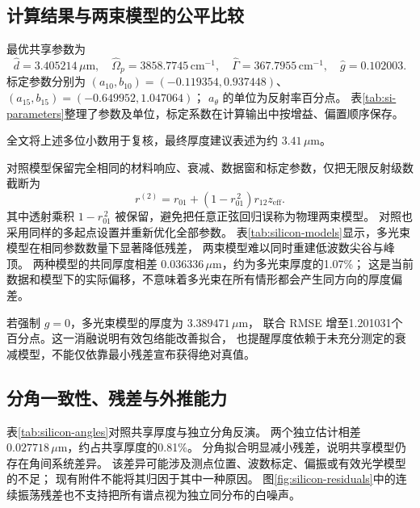 \subsection{计算结果与两束模型的公平比较}
最优共享参数为
\[
 \widehat d=3.405214\,\mu\mathrm m,\quad
 \widehat\Omega_p=3858.7745\,\mathrm{cm}^{-1},\quad
 \widehat\Gamma=367.7955\,\mathrm{cm}^{-1},\quad
 \widehat g=0.102003.
\]
标定参数分别为
$(a_{10},b_{10})=(-0.119354,0.937448)$、
$(a_{15},b_{15})=(-0.649952,1.047064)$；
$a_\theta$ 的单位为反射率百分点。
表\ref{tab:si-parameters}整理了参数及单位，标定系数在计算输出中按增益、偏置顺序保存。

全文将上述多位小数用于复核，最终厚度建议表述为约 $3.41\,\mu\mathrm m$。

对照模型保留完全相同的材料响应、衰减、数据窗和标定参数，仅把无限反射级数截断为
\[
 r^{(2)}=r_{01}+(1-r_{01}^{\,2})r_{12}z_{\mathrm{eff}}.
\]
其中透射乘积 $1-r_{01}^{\,2}$ 被保留，避免把任意正弦回归误称为物理两束模型。
对照也采用同样的多起点设置并重新优化全部参数。
表\ref{tab:silicon-models}显示，多光束模型在相同参数数量下显著降低残差，
两束模型难以同时重建低波数尖谷与峰顶。
两种模型的共同厚度相差 $0.036336\,\mu\mathrm m$，约为多光束厚度的1.07\%；
这是当前数据和模型下的实际偏移，不意味着多光束在所有情形都会产生同方向的厚度偏差。



若强制 $g=0$，多光束模型的厚度为 $3.389471\,\mu\mathrm m$，
联合 RMSE 增至1.201031个百分点。这一消融说明有效包络能改善拟合，
也提醒厚度依赖于未充分测定的衰减模型，不能仅依靠最小残差宣布获得绝对真值。

\subsection{分角一致性、残差与外推能力}
表\ref{tab:silicon-angles}对照共享厚度与独立分角反演。
两个独立估计相差 $0.027718\,\mu\mathrm m$，约占共享厚度的0.81\%。
分角拟合明显减小残差，说明共享模型仍存在角间系统差异。
该差异可能涉及测点位置、波数标定、偏振或有效光学模型的不足；
现有附件不能将其归因于其中一种原因。
图\ref{fig:silicon-residuals}中的连续振荡残差也不支持把所有谱点视为独立同分布的白噪声。



